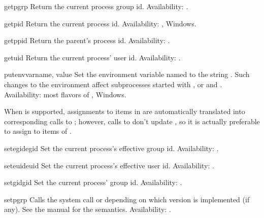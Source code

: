 \begin{funcdesc}{getpgrp}{}
Return the current process group id.
Availability: \UNIX{}.
\end{funcdesc}

\begin{funcdesc}{getpid}{}
Return the current process id.
Availability: \UNIX{}, Windows.
\end{funcdesc}

\begin{funcdesc}{getppid}{}
Return the parent's process id.
Availability: \UNIX{}.
\end{funcdesc}

\begin{funcdesc}{getuid}{}
Return the current process' user id.
Availability: \UNIX{}.
\end{funcdesc}

\begin{funcdesc}{putenv}{varname, value}
Set the environment variable named  to the string
.  Such changes to the environment affect subprocesses
started with ,  or
 and .
Availability: most flavors of \UNIX{}, Windows.

When  is
supported, assignments to items in  are automatically
translated into corresponding calls to ; however,
calls to  don't update , so it is
actually preferable to assign to items of .  
\end{funcdesc}

\begin{funcdesc}{setegid}{egid}
Set the current process's effective group id.
Availability: \UNIX{}.
\end{funcdesc}

\begin{funcdesc}{seteuid}{euid}
Set the current process's effective user id.
Availability: \UNIX{}.
\end{funcdesc}

\begin{funcdesc}{setgid}{gid}
Set the current process' group id.
Availability: \UNIX{}.
\end{funcdesc}

\begin{funcdesc}{setpgrp}{}
Calls the system call  or  depending on which version is implemented (if any).  See the
\UNIX{} manual for the semantics.
Availability: \UNIX{}.
\end{funcdesc}

